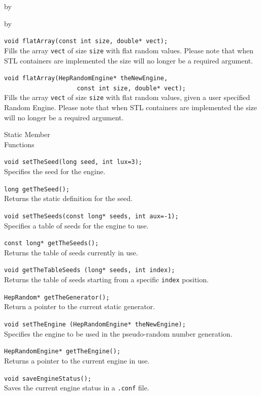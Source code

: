 \documentclass[twoside]{article}
\newcommand{\comp}[1]{\texttt{#1}}%
\newcommand{\entrylabel}[1]{\mbox{\textbf{{#1}}}\hfil}%
\newenvironment{entry}
{\begin{list}{}%
    {\renewcommand{\makelabel}{\entrylabel}%
     \setlength{\labelwidth}{90pt}%
     \setlength{\leftmargin}{\labelwidth}
     \advance\leftmargin by \labelsep%
      }%
    }%
  {\end{list}}
\newcommand{\Entrylabel}[1]%
{\raisebox{0pt}[1ex][0pt]{\makebox[\labelwidth][l]%
    {\parbox[t]{\labelwidth}{\hspace{0pt}\textbf{{#1}}}}}}
\newenvironment{Entry}%
{\renewcommand{\entrylabel}{\Entrylabel}\begin{entry}}%
  {\end{entry}}
\begin{document}
\begin{description}
\begin{Entry}
\begin{Entry}
    \verb+void flatArray(const int size, double* vect);+\\
    Fills the array \comp{vect} of size \comp{size}
    with flat random values.  Please note that when STL containers are
    implemented the size will no longer be a required argument.

    \verb+void flatArray(HepRandomEngine* theNewEngine,+\\ 
    \verb+                    const int size, double* vect);+\\
    Fills the array \comp{vect} of size \comp{size} with flat
    random values, given a user specified Random Engine.
    Please note that when STL containers are implemented the size
    will no longer be a required argument.

\item[Static Member\\ Functions]

    \verb+void setTheSeed(long seed, int lux=3);+\\
    Specifies the seed for the engine.

    \verb+long getTheSeed();+\\
    Returns the static definition for the seed.

    \verb+void setTheSeeds(const long* seeds, int aux=-1);+\\
    Specifies a table of seeds for the engine to use.

    \verb+const long* getTheSeeds();+\\
    Returns the table of seeds currently in use.

    \verb+void getTheTableSeeds (long* seeds, int index);+\\
    Returns the table of seeds starting from a specific \comp{index}
    position.

    \verb+HepRandom* getTheGenerator();+\\
    Return a pointer to the current static generator.

    \verb+void setTheEngine (HepRandomEngine* theNewEngine);+\\
    Specifies the engine to be used in the pseudo-random number generation.

    \verb+HepRandomEngine* getTheEngine();+\\
    Returns a pointer to the current engine in use.

    \verb+void saveEngineStatus();+\\
    Saves the current engine status in a \comp{.conf} file.
    

\end{Entry}
\end{Entry}
\end{description}
\end{document}
